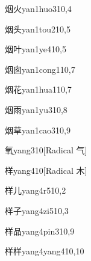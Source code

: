 \begin{verbete}{烟火}{yan1huo3}{10,4}
\end{verbete}

\begin{verbete}{烟头}{yan1tou2}{10,5}
\end{verbete}

\begin{verbete}{烟叶}{yan1ye4}{10,5}
\end{verbete}

\begin{verbete}{烟囱}{yan1cong1}{10,7}
\end{verbete}

\begin{verbete}{烟花}{yan1hua1}{10,7}
\end{verbete}

\begin{verbete}{烟雨}{yan1yu3}{10,8}
\end{verbete}

\begin{verbete}{烟草}{yan1cao3}{10,9}
\end{verbete}

\begin{verbete}{氧}{yang3}{10}[Radical 气]
\end{verbete}

\begin{verbete}{样}{yang4}{10}[Radical 木]
\end{verbete}

\begin{verbete}{样儿}{yang4r5}{10,2}
\end{verbete}

\begin{verbete}{样子}{yang4zi5}{10,3}
\end{verbete}

\begin{verbete}{样品}{yang4pin3}{10,9}
\end{verbete}

\begin{verbete}{样样}{yang4yang4}{10,10}
\end{verbete}

